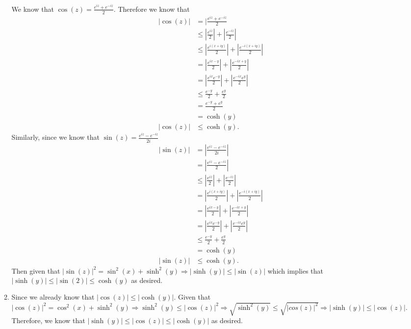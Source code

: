 \documentclass{article}
\theoremstyle{definition}
\begin{document}
\begin{enumerate}
\begin{enumerate}
        We know that $\cos(z) = \frac{e^{iz} + e^{-iz}}{2}$. Therefore we know that \begin{align*}
            |\cos(z)| &= |\frac{e^{iz} + e^{-iz}}{2}\\
            &\leq |\frac{e^{iz}}{2}| + |\frac{e^{-iz}}{2}|\\
            &\leq |\frac{e^{i(x + iy)}}{2}| + |\frac{e^{-i(x + iy)}}{2}|\\
            &= |\frac{e^{ix - y}}{2}| + |\frac{e^{-ix + y}}{2}|\\
            &= |\frac{e^{ix}e^{-y}}{2}| + |\frac{e^{-ix}e^{y}}{2}|\\
            &\leq \frac{e^{-y}}{2} + \frac{e^y}{2}\\
            &= \frac{e^{-y} + e^y}{2}\\
            &= \cosh(y)\\
            |\cos(z)| &\leq \cosh(y).
        \end{align*} Similarly, since we know that $\sin(z) = \frac{e^{iz} - e^{-iz}}{2i}$
        \begin{align*}
            |\sin(z)| &= |\frac{e^{iz} - e^{-iz}}{2i}|\\
            &= |\frac{e^{iz} - e^{-iz}}{2}|\\
            &\leq |\frac{e^{iz}}{2}| + |\frac{e^{-iz}}{2}|\\
            &= |\frac{e^{i(x + iy)}}{2}| + |\frac{e^{-i(x + iy)}}{2}|\\
            &= |\frac{e^{ix-y}}{2}| + |\frac{e^{-ix + y}}{2}|\\
            &= |\frac{e^{ix}e^{-y}}{2}| + |\frac{e^{-ix}e^y}{2}|\\
            &\leq \frac{e^{-y}}{2} + \frac{e^y}{2}\\
            &= \cosh(y)\\
            |\sin(z)| &\leq \cosh(y).
        \end{align*} Then given that $|\sin(z)|^2 = \sin^2(x) + \sinh^2(y) \Rightarrow |\sinh(y)| \leq |\sin(z)|$ which implies that $|\sinh(y)|\leq |\sin(2)|\leq \cosh(y)$ as desired.
        
        \item
        
        Since we already know that $|\cos(z)| \leq |\cosh(y)|$. Given that $|\cos(z)|^2 = \cos^2(x) + \sinh^2(y) \Rightarrow \sinh^2(y) \leq |\cos(z)|^2 \Rightarrow \sqrt{\sinh^2(y)} \leq \sqrt{|cos(z)|^2}\Rightarrow |\sinh(y)| \leq |\cos(z)|$. Therefore, we know that $|\sinh(y)| \leq |\cos(z)| \leq |\cosh(y)|$ as desired.
        

\end{enumerate}
\end{enumerate}
\end{document}
